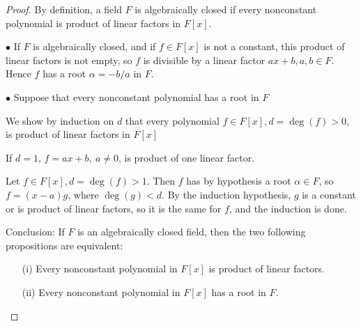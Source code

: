\documentclass[11pt,a4paper]{article}
\begin{document}
\begin{proof}
By definition, a field $F$ is algebraically closed if every nonconstant polynomial is product of linear factors in $F[x]$.

$\bullet$ If $F$ is algebraically closed, and if $f\in F[x]$ is not a constant, this product of linear factors is not empty, so $f$ is divisible by a linear factor $ax+b, a,b \in F$. Hence $f$ has a root $\alpha = -b/a$ in $F$.

$\bullet$ Suppose that every nonconstant polynomial has a root in $F$

We show by induction on $d$ that every polynomial $f \in F[x], d = \deg(f) >0$, is product of linear factors in $F[x]$

If $d=1$, $f = ax+b, \ a\ne 0$, is product of one linear factor.

Let $f \in F[x], d = \deg(f) >1$. Then $f$ has by hypothesis a root $\alpha \in F$, so $f = (x-a)g$, where $\deg(g)<d$. By the induction hypothesis, $g$ is a constant or is product of linear factors, so it is the same for $f$, and the induction is done.

Conclusion: If $F$ is an algebraically closed field, then the two following propositions are equivalent:
\begin{enumerate}
\item[(i)] Every nonconstant polynomial in $F[x]$ is product of linear factors.
\item[(ii)] Every nonconstant polynomial in $F[x]$ has a root in $F$.
\end{enumerate}
\end{proof}
\end{document}
